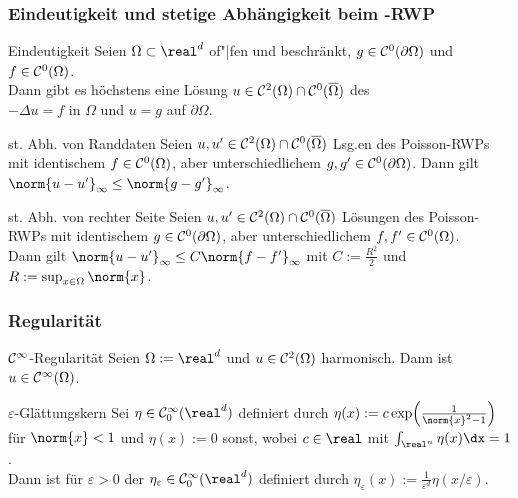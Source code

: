 \subsubsection{%
    Eindeutigkeit und stetige Abhängigkeit beim -RWP%
}

\begin{Satz}{Eindeutigkeit}
    Seien $\Omega \subset \real^d$ of"|fen und beschränkt, $g \in \mathcal{C}^0(\partial\Omega)$ und
    $f \in \mathcal{C}^0(\Omega)$.\\
    Dann gibt es höchstens eine Lösung $u \in \mathcal{C}^2(\Omega) \cap \mathcal{C}^0(\overline{\Omega})$ des
    \\
    $-\Delta u = f$ in $\Omega$ und $u = g$ auf $\partial\Omega$.
\end{Satz}

\linie

\begin{Satz}{st. Abh. von Randdaten}
    Seien $u, u' \in \mathcal{C}^2(\Omega) \cap \mathcal{C}^0(\overline{\Omega})$ Lsg.en des Poisson-RWPs
    mit identischem $f \in \mathcal{C}^0(\Omega)$, aber unterschiedlichem $g, g' \in \mathcal{C}^0(\partial\Omega)$.
    Dann gilt $\norm{u - u'}_\infty \le \norm{g - g'}_\infty$.
\end{Satz}

\begin{Satz}{st. Abh. von rechter Seite}
    Seien $u, u' \in \mathcal{C}^2(\Omega) \cap \mathcal{C}^0(\overline{\Omega})$ Lösungen des Poisson-RWPs
    mit identischem
    $g \in \mathcal{C}^0(\partial\Omega)$, aber unterschiedlichem
    $f, f' \in \mathcal{C}^0(\Omega)$.\\
    Dann gilt $\norm{u - u'}_\infty \le C \norm{f - f'}_\infty$
    mit $C := \frac{R^2}{2}$ und $R := \sup_{x \in \Omega} \norm{x}$.
\end{Satz}

\subsubsection{%
    Regularität%
}

\begin{Satz}{$\mathcal{C}^\infty$-Regularität}
    Seien $\Omega := \real^d$ und $u \in \mathcal{C}^2(\Omega)$ harmonisch.
    Dann ist $u \in \mathcal{C}^\infty(\Omega)$.
\end{Satz}

\linie

\begin{Def}{$\varepsilon$-Glättungskern}
    Sei $\eta \in \C^\infty_0(\real^d)$ definiert durch
    $\eta(x) := c \exp\!\left(\frac{1}{\norm{x}^2 - 1}\right)$ für $\norm{x} < 1$ und
    $\eta(x) := 0$ sonst, wobei $c \in \real$ mit $\int_{\real^n} \eta(x) \dx = 1$.\\
    Dann ist für $\varepsilon > 0$ der 
    $\eta_\varepsilon \in \C^\infty_0(\real^d)$ definiert durch
    $\eta_\varepsilon(x) := \frac{1}{\varepsilon^d} \eta(x/\varepsilon)$.
\end{Def}

